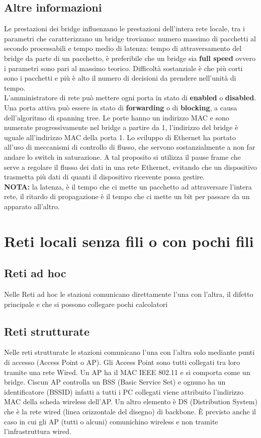\documentclass{article}
\begin{document}
\subsection{Altre informazioni}
Le prestazioni dei bridge influenzano le prestazioni dell'intera rete locale, tra i parametri che caratterizzano un bridge troviamo: numero massimo di pacchetti al secondo processabili e tempo medio di latenza: tempo di attraversamento del bridge da parte di un pacchetto, è preferibile che un bridge sia \textbf{full speed} ovvero i parametri sono pari al massimo teorico. Difficoltà sostanziale è che più corti sono i pacchetti e più è alto il numero di decisioni da prendere nell'unità di tempo.\\
L'amministratore di rete può mettere ogni porta in stato di \textbf{enabled} o \textbf{disabled}. Una porta attiva può essere in stato di \textbf{forwarding} o di \textbf{blocking}, a causa dell'algoritmo di spanning tree. Le porte hanno un indirizzo MAC e sono numerate progressivamente nel bridge a partire da 1, l'indirizzo del bridge è uguale all'indirizzo MAC della porta 1. Lo sviluppo di Ethernet ha portato all'uso di meccanismi di controllo di flusso, che servono sostanzialmente a non far andare lo switch in saturazione. A tal proposito si utilizza il pause frame che serve a regolare il flusso dei dati in una rete Ethernet, evitando che un dispositivo trasmetta più dati di quanti il dispositivo ricevente possa gestire.\\
\textbf{NOTA:} la latenza, è il tempo che ci mette un pacchetto ad attraversare l'intera rete, il ritardo di propagazione è il tempo che ci mette un bit per passare da un apparato all'altro.
\section{Reti locali senza fili o con pochi fili}
\subsection{Reti ad hoc}
Nelle Reti ad hoc le stazioni comunicano direttamente l'una con l'altra, il difetto principale e che si possono collegare pochi calcolatori
\subsection{Reti strutturate}
Nelle reti strutturate le stazioni comunicano l'una con l'altra solo mediante punti di accesso (Access Point o AP). Gli Access Point sono tutti collegati tra loro tramite una rete Wired. Un AP ha il MAC IEEE 802.11 e si comporta come un bridge. Ciscun AP controlla un BSS (Basic Service Set) e ognuno ha un identificatore (BSSID) infatti a tutti i PC collegati viene attribuito l’indirizzo MAC della scheda wireless dell’AP. Un altro elemento è DS (Distribution System) che è la rete wired (linea orizzontale del disegno) di backbone. È previsto anche il caso in cui gli AP (tutti o alcuni) comunichino wireless e non tramite l’infrastruttura wired.
\end{document}
